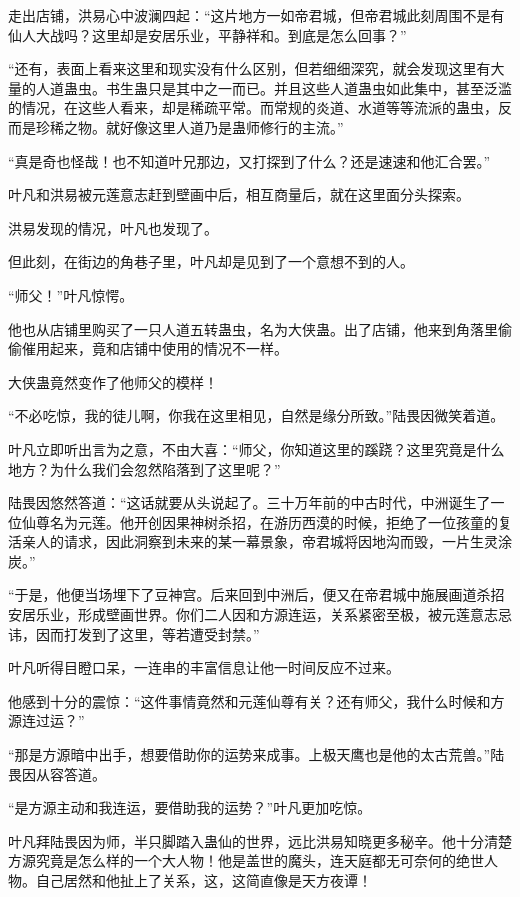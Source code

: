 \begin{this_body}
走出店铺，洪易心中波澜四起：“这片地方一如帝君城，但帝君城此刻周围不是有仙人大战吗？这里却是安居乐业，平静祥和。到底是怎么回事？”

“还有，表面上看来这里和现实没有什么区别，但若细细深究，就会发现这里有大量的人道蛊虫。书生蛊只是其中之一而已。并且这些人道蛊虫如此集中，甚至泛滥的情况，在这些人看来，却是稀疏平常。而常规的炎道、水道等等流派的蛊虫，反而是珍稀之物。就好像这里人道乃是蛊师修行的主流。”

“真是奇也怪哉！也不知道叶兄那边，又打探到了什么？还是速速和他汇合罢。”

叶凡和洪易被元莲意志赶到壁画中后，相互商量后，就在这里面分头探索。

洪易发现的情况，叶凡也发现了。

但此刻，在街边的角巷子里，叶凡却是见到了一个意想不到的人。

“师父！”叶凡惊愕。

他也从店铺里购买了一只人道五转蛊虫，名为大侠蛊。出了店铺，他来到角落里偷偷催用起来，竟和店铺中使用的情况不一样。

大侠蛊竟然变作了他师父的模样！

“不必吃惊，我的徒儿啊，你我在这里相见，自然是缘分所致。”陆畏因微笑着道。

叶凡立即听出言为之意，不由大喜：“师父，你知道这里的蹊跷？这里究竟是什么地方？为什么我们会忽然陷落到了这里呢？”

陆畏因悠然答道：“这话就要从头说起了。三十万年前的中古时代，中洲诞生了一位仙尊名为元莲。他开创因果神树杀招，在游历西漠的时候，拒绝了一位孩童的复活亲人的请求，因此洞察到未来的某一幕景象，帝君城将因地沟而毁，一片生灵涂炭。”

“于是，他便当场埋下了豆神宫。后来回到中洲后，便又在帝君城中施展画道杀招安居乐业，形成壁画世界。你们二人因和方源连运，关系紧密至极，被元莲意志忌讳，因而打发到了这里，等若遭受封禁。”

叶凡听得目瞪口呆，一连串的丰富信息让他一时间反应不过来。

他感到十分的震惊：“这件事情竟然和元莲仙尊有关？还有师父，我什么时候和方源连过运？”

“那是方源暗中出手，想要借助你的运势来成事。上极天鹰也是他的太古荒兽。”陆畏因从容答道。

“是方源主动和我连运，要借助我的运势？”叶凡更加吃惊。

叶凡拜陆畏因为师，半只脚踏入蛊仙的世界，远比洪易知晓更多秘辛。他十分清楚方源究竟是怎么样的一个大人物！他是盖世的魔头，连天庭都无可奈何的绝世人物。自己居然和他扯上了关系，这，这简直像是天方夜谭！


\end{this_body}
